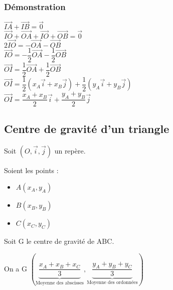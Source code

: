 \subsubsection{Démonstration}

$ \overrightarrow{IA} + \overrightarrow{IB} = \overrightarrow{0} $\\

$ \overrightarrow{IO} + \overrightarrow{OA} + \overrightarrow{IO} + \overrightarrow{OB} = \overrightarrow{0} $\\

$ 2\overrightarrow{IO} = -\overrightarrow{OA} -\overrightarrow{OB} $\\

$ \overrightarrow{IO} = -\dfrac{1}{2} \overrightarrow{OA} - \dfrac{1}{2} \overrightarrow{OB} $\\

$ \overrightarrow{OI} = \dfrac{1}{2} \overrightarrow{OA} + \dfrac{1}{2} \overrightarrow{OB} $\\

$ \overrightarrow{OI} = \dfrac{1}{2} \left(x_A\vec{i} + x_B\vec{j} \right) + \dfrac{1}{2} \left( y_A\vec{i} + y_B\vec{j}\right) $\\

$ \overrightarrow{OI} = \dfrac{x_A + x_B}{2}\vec{i} + \dfrac{y_A + y_B}{2} \vec{j} $


\newpage


\subsection{Centre de gravité d'un triangle}

Soit $\left(O, \vec{i}, \vec{j}\right)$ un repère.

Soient les points :

\begin{itemize}
\item $A\left(x_A,y_A\right)$\\
\item $B\left(x_B,y_B\right)$\\
\item $C\left(x_C,y_C\right)$\\
\end{itemize}
 
 Soit G le centre de gravité de ABC.
 
On a G $ \left(\underbrace{\dfrac{x_A + x_B + x_C}{3}}_{\textrm{Moyenne des abscisses}}, \underbrace{\dfrac{y_A + y_B + y_C}{3}}_{\textrm{Moyenne des ordonnées}}\right) $ \\

